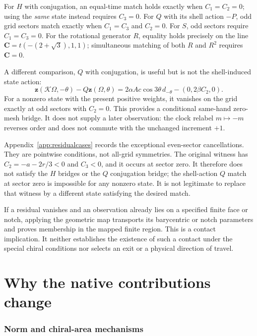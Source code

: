 \documentclass[11pt,a4paper]{article}
\numberwithin{equation}{section}
\newcommand{\zobs}{\mathbf z}
\newcommand{\chiral}{\mathbf C}
\begin{document}
For $H$ with conjugation, an equal-time match holds exactly when
$C_1=C_2=0$; using the \emph{same} state instead requires $C_3=0$.
For $Q$ with its shell action $-P$, odd grid sectors match exactly when
$C_1=C_3$ and $C_2=0$. For $S$, odd sectors require $C_1=C_3=0$.
For the rotational generator $R$, equality holds precisely on the line
$\chiral=t(-(2+\sqrt3),1,1)$; simultaneous matching of both $R$ and $R^2$
requires $\chiral=0$.

A different comparison, $Q$ with conjugation, is useful but is not the
shell-induced state action:
\begin{equation}\label{eq:qconj}
\zobs(\mathcal K\Omega,-\theta)-Q\zobs(\Omega,\theta)
=2\alpha Ac\cos3\theta\,d_{-\theta}-(0,2\beta C_2,0).
\end{equation}
For a nonzero state with the present positive weights, it vanishes on the
grid exactly at odd sectors with $C_2=0$. This provides a conditional
same-hand zero-mesh bridge. It does not supply a later observation: the
clock relabel $m\mapsto-m$ reverses order and does not commute with the
unchanged increment $+1$.

Appendix~\ref{app:residualcases} records the exceptional even-sector
cancellations. They are pointwise conditions, not all-grid symmetries.
The original witness has
$C_2=-a-2r/3<0$ and $C_3<0$, and it occurs at sector zero. It therefore
does not satisfy the $H$ bridges or the $Q$ conjugation bridge; the
shell-action $Q$ match at sector zero is impossible for any nonzero state.
It is not legitimate to replace that witness by a different state satisfying
the desired match.

If a residual vanishes and an observation already lies on a specified finite
face or notch, applying the geometric map transports its barycentric or
notch parameters and proves membership in the mapped finite region. This
is a contact implication. It neither establishes the existence of such a
contact under the special chiral conditions nor selects an exit or a
physical direction of travel.

\clearpage
\part{Why the native contributions change}

\section{Norm and chiral-area mechanisms}\label{sec:mechanism}
\end{document}
